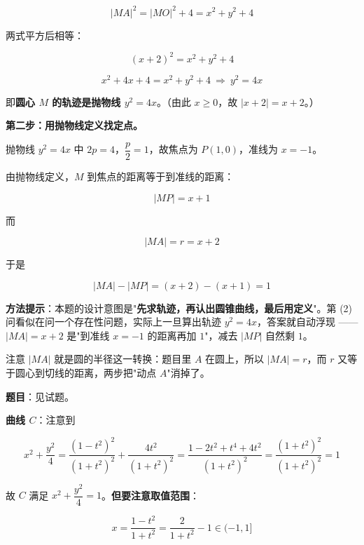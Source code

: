 \[|MA|^{2}=|MO|^{2}+4=x^{2}+y^{2}+4\]

两式平方后相等：

\[(x+2)^{2}=x^{2}+y^{2}+4\]

\[x^{2}+4x+4=x^{2}+y^{2}+4\ \Longrightarrow\ \boxed{y^{2}=4x}\]

即\textbf{圆心 $M$ 的轨迹是抛物线 $y^{2}=4x$}。（由此 $x\ge0$，故 $|x+2|=x+2$。）

\textbf{第二步：用抛物线定义找定点。}

抛物线 $y^{2}=4x$ 中 $2p=4$，$\dfrac p2=1$，故焦点为 $P(1,0)$，准线为 $x=-1$。

由抛物线定义，$M$ 到焦点的距离等于到准线的距离：

\[|MP|=x+1\]

而

\[|MA|=r=x+2\]

于是

\[|MA|-|MP|=(x+2)-(x+1)=1\]


\begin{gktip}
\textbf{方法提示}：本题的设计意图是"\textbf{先求轨迹，再认出圆锥曲线，最后用定义}"。第 (2) 问看似在问一个存在性问题，实际上一旦算出轨迹 $y^{2}=4x$，答案就自动浮现 —— $|MA|=x+2$ 是"到准线 $x=-1$ 的距离再加 $1$"，减去 $|MP|$ 自然剩 $1$。

注意 $|MA|$ 就是圆的半径这一转换：题目里 $A$ 在圆上，所以 $|MA|=r$，而 $r$ 又等于圆心到切线的距离，两步把"动点 $A$"消掉了。
\end{gktip}

\par\medskip



\textbf{题目}：见试题。


\textbf{曲线 $C$}：注意到

\[x^{2}+\frac{y^{2}}4=\frac{\left(1-t^{2}\right)^{2}}{\left(1+t^{2}\right)^{2}}+\frac{4t^{2}}{\left(1+t^{2}\right)^{2}}=\frac{1-2t^{2}+t^{4}+4t^{2}}{\left(1+t^{2}\right)^{2}}=\frac{\left(1+t^{2}\right)^{2}}{\left(1+t^{2}\right)^{2}}=1\]

故 $C$ 满足 $x^{2}+\dfrac{y^{2}}4=1$。\textbf{但要注意取值范围}：

\[x=\frac{1-t^{2}}{1+t^{2}}=\frac2{1+t^{2}}-1\in(-1,1]\]


